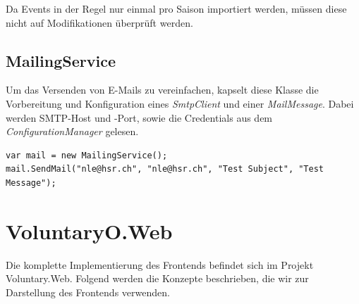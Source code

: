 	\noindent
	Da Events in der Regel nur einmal pro Saison importiert werden, müssen diese nicht auf Modifikationen überprüft werden.
	
	\subsection{MailingService}
	Um das Versenden von E-Mails zu vereinfachen, kapselt diese Klasse die Vorbereitung und Konfiguration eines \textit{SmtpClient} und einer \textit{MailMessage}. Dabei werden SMTP-Host und -Port, sowie die Credentials aus dem \textit{ConfigurationManager} gelesen.  

	\begin{lstlisting}[language=CSharp, caption=Verwendung des MailingService, label=lst:mailingservice, firstnumber=1]
var mail = new MailingService();
mail.SendMail("nle@hsr.ch", "nle@hsr.ch", "Test Subject", "Test Message");
    \end{lstlisting}
    



\section{VoluntaryO.Web}

	Die komplette Implementierung des Frontends befindet sich im Projekt Voluntary.Web. Folgend werden die Konzepte beschrieben, die wir zur Darstellung des Frontends verwenden.

